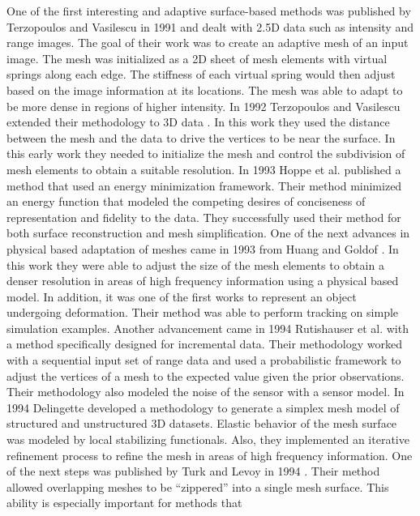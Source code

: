 One of the first interesting and adaptive surface-based methods was published by
Terzopoulos and Vasilescu in 1991 \cite{Terzopoulos1991a} and dealt with 2.5D
data such as intensity and range images. The goal of their work was to create an
adaptive mesh of an input image. The mesh was initialized as a 2D sheet of mesh
elements with virtual springs along each edge. The stiffness of each virtual
spring would then adjust based on the image information at its locations. The
mesh was able to adapt to be more dense in regions of higher intensity. In 1992
Terzopoulos and Vasilescu extended their methodology to 3D data
\cite{Vasilescu1992}. In this work they used the distance between the mesh and
the data to drive the vertices to be near the surface. In this early work they
needed to initialize the mesh and control the subdivision of mesh elements to
obtain a suitable resolution. In 1993 Hoppe et al. \cite{Hoppe1993} published a
method that used an energy minimization framework. Their method minimized an
energy function that modeled the competing desires of conciseness of
representation and fidelity to the data. They successfully used their method for
both surface reconstruction and mesh simplification. One of the next advances
in physical based adaptation of meshes came in 1993 from Huang and Goldof
\cite{Huang1993}. In this work they were able to adjust the size of the mesh
elements to obtain a denser resolution in areas of high frequency information
using a physical based model. In addition, it was one of the first works to
represent an object undergoing deformation. Their method was able to perform
tracking on simple simulation examples. Another advancement came in 1994
Rutishauser et al. \cite{Rutishauser1994} with a method specifically designed
for incremental data. Their methodology worked with a sequential input set of
range data and used a probabilistic framework to adjust the vertices of a mesh
to the expected value given the prior observations. Their methodology also
modeled the noise of the sensor with a sensor model. In 1994 Delingette
\cite{Delingette1994} developed a methodology to generate a simplex mesh model
of structured and unstructured 3D datasets. Elastic behavior of the mesh surface
was modeled by local stabilizing functionals. Also, they implemented an
iterative refinement process to refine the mesh in areas of high frequency
information. One of the next steps was published by Turk and Levoy in 1994
\cite{Turk1994}. Their method allowed overlapping meshes to be ``zippered'' into
a single mesh surface. This ability is especially important for methods that
